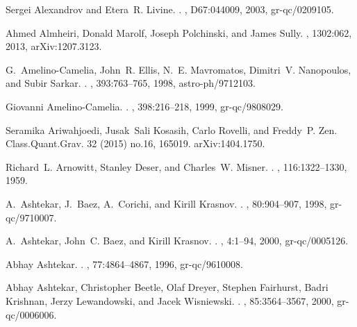 \documentclass[aps, nofootinbib,superscriptaddress,12pt]{revtex4-2}
\begin{document}
\begin{thebibliography}{100}
Sergei Alexandrov and Etera~R. Livine.
.
, D67:044009, 2003, gr-qc/0209105.

Ahmed Almheiri, Donald Marolf, Joseph Polchinski, and James Sully.
, 1302:062, 2013, arXiv:1207.3123.

G.~Amelino-Camelia, John~R. Ellis, N.~E. Mavromatos, Dimitri~V. Nanopoulos, and
  Subir Sarkar.
.
, 393:763--765, 1998, astro-ph/9712103.

Giovanni Amelino-Camelia.
.
, 398:216--218, 1999, gr-qc/9808029.

Seramika Ariwahjoedi, Jusak~Sali Kosasih, Carlo Rovelli, and Freddy~P. Zen.
\newblock Class.Quant.Grav. 32 (2015) no.16, 165019. 
\newblock arXiv:1404.1750.

Richard~L. Arnowitt, Stanley Deser, and Charles~W. Misner.
.
, 116:1322--1330, 1959.

A.~Ashtekar, J.~Baez, A.~Corichi, and Kirill Krasnov.
.
, 80:904--907, 1998, gr-qc/9710007.

A.~Ashtekar, John~C. Baez, and Kirill Krasnov.
.
, 4:1--94, 2000, gr-qc/0005126.

Abhay Ashtekar.
.
, 77:4864--4867, 1996, gr-qc/9610008.

Abhay Ashtekar, Christopher Beetle, Olaf Dreyer, Stephen Fairhurst, Badri
  Krishnan, Jerzy Lewandowski, and Jacek Wisniewski.
.
, 85:3564--3567, 2000, gr-qc/0006006.


\end{thebibliography}
\end{document}
